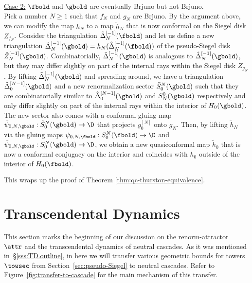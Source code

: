 \documentclass{amsart}
\begin{document}
    \noindent \underline{Case 2:} $\fbold$ and $\gbold$ are eventually Brjuno but not Brjuno. \\ 
    Pick a number $N \geq 1$ such that $f_N$ and $g_N$ are Brjuno.
    By the argument above, we can modify the map $h_N$ to a map $\tilde{h}_N$ that is now conformal on the Siegel disk $Z_{f_N}$.
    Consider the triangulation $\hat{\Delta}_N^{[-1]}(\fbold)$ and let us define a new triangulation $\tilde{\Delta}_N^{[-1]}(\gbold) = h_N( \hat{\Delta}_N^{[-1]}(\fbold) )$ of the pseudo-Siegel disk $\hat{Z}^{[-1]}_N(\gbold)$.
    Combinatorially, $\tilde{\Delta}_N^{[-1]}(\gbold)$ is analogous to $\hat{\Delta}_N^{[-1]}(\gbold)$, but they may differ slightly on part of the internal rays within the Siegel disk $Z_{g_N}$.
    By lifting $\tilde{\Delta}_N^{[-1]}(\gbold)$ and spreading around, we have a triangulation $\tilde{\Delta}_0^{[N-1]}(\gbold)$ and a new renormalization sector $\tilde{S}_0^N(\gbold)$ such that they are combinatorially similar to $\hat{\Delta}_0^{[N-1]}(\gbold)$ and $S_N^0(\gbold)$ respectively and only differ slightly on part of the internal rays within the interior of $H_0(\gbold)$.
    The new sector also comes with a conformal gluing map $\tilde{\psi}_{0,N,\gbold}: \tilde{S}_0^N(\gbold) \to \D$ that projects $g_0^{[N]}$ onto $g_N$.
    Then, by lifting $\tilde{h}_N$ via the gluing maps $\psi_{0,N,\fbold}: S_0^N(\fbold) \to \D$ and $\tilde{\psi}_{0,N,\gbold}: S_0^N(\gbold) \to \D$, we obtain a new quasiconformal map $\tilde{h}_0$ that is now a conformal conjugacy on the interior and coincides with $h_0$ outside of the interior of $H_0(\fbold)$. 
\vspace{0.1in}

This wraps up the proof of Theorem \ref{thm:qc-thurston-equivalence}.


\section{Transcendental Dynamics}
\label{sec:transcendental-dynamics}
This section marks the beginning of our discussion on the renorm-attractor $\attr$ and the transcendental dynamics of neutral cascades. As it was mentioned in~\S\ref{sss:TD.outline}, in here we will transfer various geometric bounds for towers $\towsec$ from Section~\ref{sec:pseudo-Siegel} to neutral cascades. Refer to Figure~\ref{fig:transfer-to-cascade} for the main mechanism  of this transfer.
\end{document}
